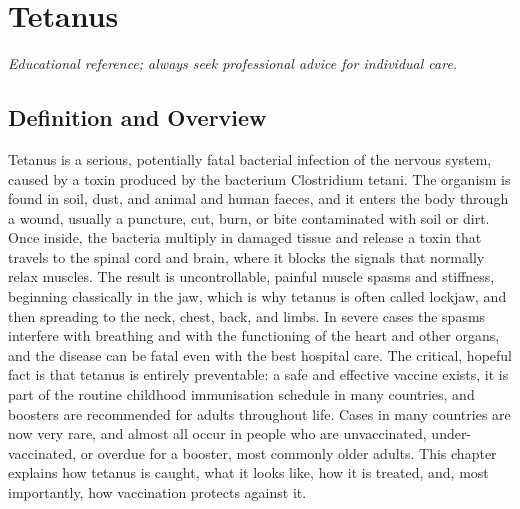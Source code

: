 \chapter{Tetanus}

\medskip
\noindent\textit{Educational reference; always seek professional advice for individual care.}

\section*{Definition and Overview}
Tetanus is a serious, potentially fatal bacterial infection of the nervous system, caused by a toxin produced by the bacterium Clostridium tetani. The organism is found in soil, dust, and animal and human faeces, and it enters the body through a wound, usually a puncture, cut, burn, or bite contaminated with soil or dirt. Once inside, the bacteria multiply in damaged tissue and release a toxin that travels to the spinal cord and brain, where it blocks the signals that normally relax muscles. The result is uncontrollable, painful muscle spasms and stiffness, beginning classically in the jaw, which is why tetanus is often called lockjaw, and then spreading to the neck, chest, back, and limbs. In severe cases the spasms interfere with breathing and with the functioning of the heart and other organs, and the disease can be fatal even with the best hospital care. The critical, hopeful fact is that tetanus is entirely preventable: a safe and effective vaccine exists, it is part of the routine childhood immunisation schedule in many countries, and boosters are recommended for adults throughout life. Cases in many countries are now very rare, and almost all occur in people who are unvaccinated, under-vaccinated, or overdue for a booster, most commonly older adults. This chapter explains how tetanus is caught, what it looks like, how it is treated, and, most importantly, how vaccination protects against it.

